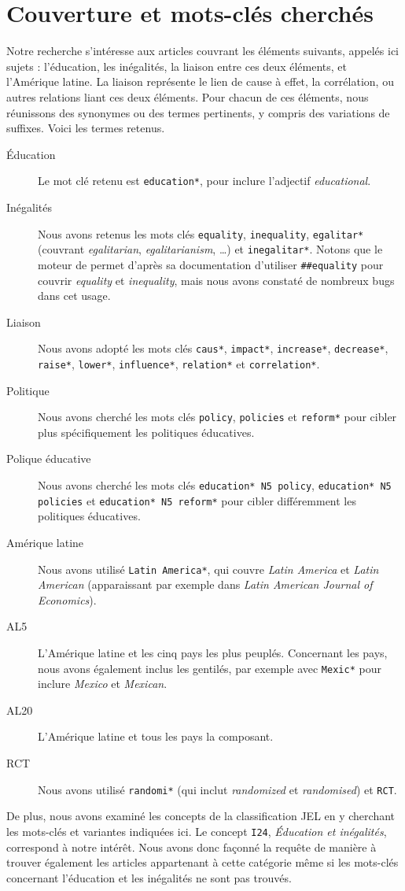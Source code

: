 \documentclass[pagesize, twoside=off, bibliography=totoc, DIV=calc, fontsize=12pt, a4paper, french]{scrartcl}
\begin{document}
\section{Couverture et mots-clés cherchés}
Notre recherche s’intéresse aux articles couvrant les éléments suivants, appelés ici \og{}sujets\fg{} : l’éducation, les inégalités, la liaison entre ces deux éléments, et l’Amérique latine. La liaison représente le lien de cause à effet, la corrélation, ou autres relations liant ces deux éléments. Pour chacun de ces éléments, nous réunissons des synonymes ou des termes pertinents, y compris des variations de suffixes. Voici les termes retenus.

\begin{description}
  \item[Éducation] Le mot clé retenu est \texttt{education*}, pour inclure l’adjectif \emph{educational}.
  \item[Inégalités] Nous avons retenus les mots clés \texttt{equality}, \texttt{inequality}, \texttt{egalitar*} (couvrant \emph{egalitarian}, \emph{egalitarianism}, …) et \texttt{inegalitar*}. Notons que le moteur de \citet{ebscohost_searching_2024} permet d’après sa documentation d’utiliser \texttt{\#\#equality} pour couvrir \emph{equality} et \emph{inequality}, mais nous avons constaté de nombreux bugs dans cet usage.
  \item[Liaison] Nous avons adopté les mots clés \texttt{caus*}, \texttt{impact*}, \texttt{increase*}, \texttt{decrease*}, \texttt{raise*}, \texttt{lower*}, \texttt{influence*}, \texttt{relation*} et \texttt{correlation*}.
  \item[Politique] Nous avons cherché les mots clés \texttt{policy}, \texttt{policies} et \texttt{reform*} pour cibler plus spécifiquement les politiques éducatives.
  \item[Polique éducative] Nous avons cherché les mots clés \texttt{education* N5 policy}, \texttt{education* N5 policies} et \texttt{education* N5 reform*} pour cibler différemment les politiques éducatives. 
  \item[Amérique latine] Nous avons utilisé \texttt{Latin America*}, qui couvre \emph{Latin America} et \emph{Latin American} (apparaissant par exemple dans \emph{Latin American Journal of Economics}). 
  \item[AL5] L’Amérique latine et les cinq pays les plus peuplés. Concernant les pays, nous avons également inclus les gentilés, par exemple avec \texttt{Mexic*} pour inclure \emph{Mexico} et \emph{Mexican}.
  \item[AL20] L’Amérique latine et tous les pays la composant.
  \item[RCT] Nous avons utilisé \texttt{randomi*} (qui inclut \emph{randomized} et \emph{randomised}) et \texttt{RCT}.
\end{description}
De plus, nous avons examiné les concepts de la classification JEL en y cherchant les mots-clés et variantes indiquées ici. Le concept \texttt{I24}, \emph{Éducation et inégalités}, correspond à notre intérêt.
Nous avons donc façonné la requête de manière à trouver également les articles appartenant à cette catégorie même si les mots-clés concernant l’éducation et les inégalités ne sont pas trouvés.
\end{document}
